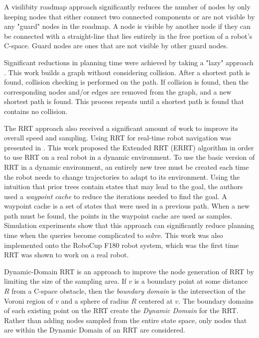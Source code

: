 \documentclass[10pt,conference]{ieeeconf}
\begin{document}
A visilibity roadmap approach \cite{nissoux1999visibility} significantly reduces the number of nodes by only keeping nodes that either connect two connected components or are not visible by any "guard" nodes in the roadmap. A node is visible by another node if they can be connected with a straight-line that lies entirely in the free portion of a robot's C-space. Guard nodes are ones that are not visible by other guard nodes. 

Significant reductions in planning time were achieved by taking a "lazy" approach \cite{bohlin2000path}. This work builds a graph without considering collision. After a shortest path is found, collision checking is performed on the path. If collision is found, then the corresponding nodes and/or edges are removed from the graph, and a new shortest path is found. This process repeats until a shortest path is found that contains no collision.


The RRT approach also received a significant amount of work to improve its overall speed and sampling. Using RRT for real-time robot navigation was presented in \cite{bruce2002real}. This work proposed the Extended RRT (ERRT) algorithm in order to use RRT on a real robot in a dynamic environment. To use the basic version of RRT in a dynamic environment, an entirely new tree must be created each time the robot needs to change trajectories to adapt to its environment. Using the intuition that prior trees contain states that may lead to the goal, the authors used a \emph{waypoint cache} to reduce the iterations needed to find the goal. A waypoint cache is a set of states that were used in a previous path. When a new path must be found, the points in the waypoint cache are used as samples. Simulation experiments show that this approach can significantly reduce planning time when the queries become complicated to solve. This work was also implemented onto the RoboCup F180 robot system, which was the first time RRT was shown to work on a real robot. 

Dynamic-Domain RRT \cite{yershova2005dynamic} is an approach to improve the node generation of RRT by limiting the size of the sampling area. If $v$ is a boundary point at some distance $R$ from a C-space obstacle, then the \emph{boundary domain} is the intersection of the Voroni region of $v$ and a sphere of radius $R$ centered at $v$. The boundary domains of each existing point on the RRT create the \emph{Dynamic Domain} for the RRT. Rather than adding nodes sampled from the entire state space, only nodes that are within the Dynamic Domain of an RRT are considered.
\end{document}

